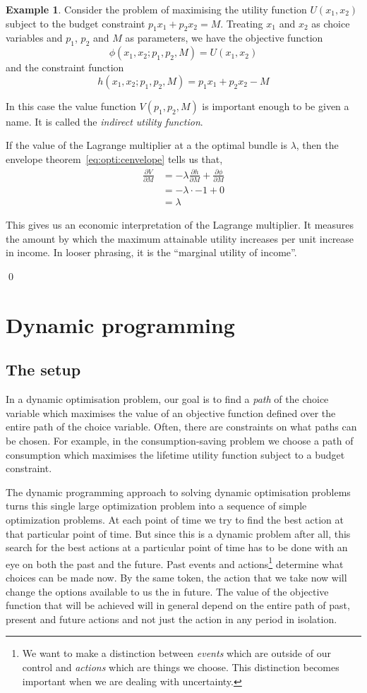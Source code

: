 \documentclass[11pt,reqno,openany]{amsbook}
\theoremstyle{plain}
\theoremstyle{definition}
\newtheorem{exmp}{Example}[chapter]
\begin{document}
\begin{exmp}
Consider the problem of maximising the utility function $U(x_1,x_2)$
subject to the budget constraint $p_1x_1+p_2x_2=M$. Treating $x_1$ and
$x_2$ as choice variables and $p_1$, $p_2$ and $M$ as parameters, we
have the objective function
\[\phi(x_1,x_2;p_1,p_2,M) = U(x_1,x_2)\]
and the constraint function
\[h(x_1,x_2;p_1,p_2,M)=p_1x_1+p_2x_2-M\]

In this case the value function $V(p_1,p_2,M)$ is important enough to
be given a name. It is called the \emph{indirect utility function}.

If the value of the Lagrange multiplier at a the optimal bundle is
$\lambda$, then the envelope theorem~\eqref{eq:opti:cenvelope} tells
us that,
\begin{align*}
\frac{\partial V}{\partial M}&=
-\lambda\frac{\partial h}{\partial  M}
+\frac{\partial \phi}{\partial M}\\
&=-\lambda \cdot -1+0\\
&=\lambda
\end{align*}

This gives us an economic interpretation of the Lagrange multiplier.
It measures the amount by which the maximum attainable utility
increases per unit increase in income. In looser phrasing, it is the
``marginal utility of income''.

\qed
\end{exmp}

\chapter{Dynamic programming}
\section{The setup}
In a dynamic optimisation problem, our goal is to find a \emph{path}
of the choice variable which maximises the value of an objective
function defined over the entire path of the choice variable. Often,
there are constraints on what paths can be chosen. For example, in the
consumption-saving problem we choose a path of consumption which
maximises the lifetime utility function subject to a budget
constraint.

The dynamic programming approach to solving dynamic optimisation
problems  turns this single large optimization problem into a
sequence of simple optimization problems. At each point of time we try
to find the best action at that particular point of time. But since
this is a dynamic problem after all, this search for the best actions
at a particular point of time has to be done with an eye on both the
past and the future. Past events and actions\footnote{We want to make
  a distinction between \emph{events} which are outside of our control
  and \emph{actions} which are things we choose. This distinction
  becomes important when we are dealing with uncertainty.} determine what choices can be made now. By the
same token, the action that we take now will change the options
available to us the in future. The value of the objective function
that will be achieved will in general depend on the entire path of
past, present and future actions and not just the action in any period in
isolation.
\end{document}
